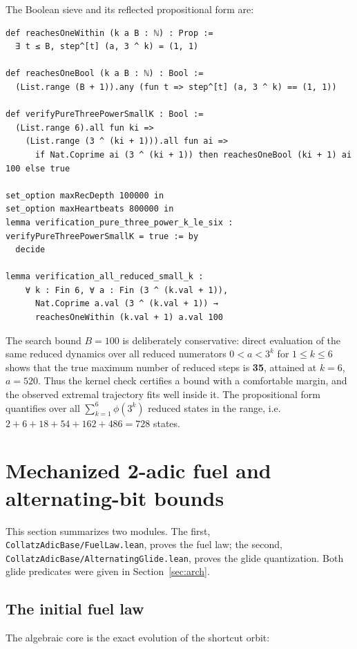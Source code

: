 \documentclass[11pt,a4paper]{article}
\begin{document}
The Boolean sieve and its reflected propositional form are:

\begin{lstlisting}
def reachesOneWithin (k a B : ℕ) : Prop :=
  ∃ t ≤ B, step^[t] (a, 3 ^ k) = (1, 1)

def reachesOneBool (k a B : ℕ) : Bool :=
  (List.range (B + 1)).any (fun t => step^[t] (a, 3 ^ k) == (1, 1))

def verifyPureThreePowerSmallK : Bool :=
  (List.range 6).all fun ki =>
    (List.range (3 ^ (ki + 1))).all fun ai =>
      if Nat.Coprime ai (3 ^ (ki + 1)) then reachesOneBool (ki + 1) ai 100 else true

set_option maxRecDepth 100000 in
set_option maxHeartbeats 800000 in
lemma verification_pure_three_power_k_le_six : verifyPureThreePowerSmallK = true := by
  decide

lemma verification_all_reduced_small_k :
    ∀ k : Fin 6, ∀ a : Fin (3 ^ (k.val + 1)),
      Nat.Coprime a.val (3 ^ (k.val + 1)) →
      reachesOneWithin (k.val + 1) a.val 100
\end{lstlisting}

\noindent The search bound $B=100$ is deliberately conservative: direct
evaluation of the same reduced dynamics over all reduced numerators
$0<a<3^{k}$ for $1\le k\le 6$ shows that the true maximum number of reduced
steps is \textbf{35}, attained at $k=6$, $a=520$.  Thus the kernel check certifies
a bound with a comfortable margin, and the observed extremal trajectory fits
well inside it.  The propositional form quantifies over all $\sum_{k=1}^{6}\phi(3^{k})$
reduced states in the range, i.e.\ $2+6+18+54+162+486=728$ states.

\section{Mechanized 2-adic fuel and alternating-bit bounds}
\label{sec:glide}

This section summarizes two modules.  The first,
\texttt{CollatzAdicBase/FuelLaw.lean}, proves the fuel law; the second,
\texttt{CollatzAdicBase/AlternatingGlide.lean}, proves the glide quantization.
Both glide predicates were given in Section~\ref{sec:arch}.

\subsection{The initial fuel law}

The algebraic core is the exact evolution of the shortcut orbit:
\end{document}

